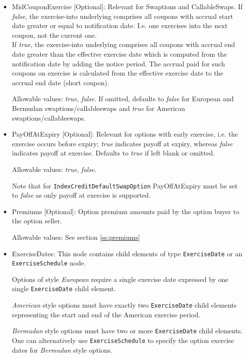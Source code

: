 \begin{itemize}
\item MidCouponExercise [Optional]: Relevant for Swaptions and CallableSwaps.
If \emph{false}, the exercise-into underlying comprises all coupons with accrual start date greater or equal to notification date. I.e. one exercises into the next coupon, not the current one.\\
If \emph{true}, the exercise-into underlying
comprises all coupons with accrual end date greater than the effective exercise date which is computed from the notification date by adding the notice period.
The accrual paid for such coupons on exercise is calculated from the effective exercise date to the accrual end date (short coupon).

Allowable values: \emph{true}, \emph{false}. If omitted, defaults to \emph{false} for European and Bermudan swaptions/callableswaps and \emph{true} for American swaptions/callableswaps.

\item PayOffAtExpiry [Optional]: Relevant for options with early
  exercise, i.e. the exercise occurs before expiry; \emph{true} indicates payoff at expiry, whereas \emph{false}
  indicates payoff at exercise. Defaults to \emph{true} if left blank or omitted.

Allowable values: \emph{true}, \emph{false}.

Note that for \lstinline!IndexCreditDefaultSwapOption! PayOffAtExpiry must be set to \emph{false} as only payoff at exercise is supported.



\item Premiums [Optional]: Option premium amounts paid by the option buyer to the option seller.

Allowable values:  See section \ref{ss:premiums}

\item ExerciseDates: This node contains child elements of type
  \lstinline!ExerciseDate! or an \lstinline!ExerciseSchedule! node.

  Options of style \emph{European}
  require a single exercise date expressed by one
  single \lstinline!ExerciseDate! child element.

  \emph{American} style
  options must have exactly two  \lstinline!ExerciseDate! child
  elements representing the start and end of the American exercise period.

  \emph{Bermudan} style options must have two or more \lstinline!ExerciseDate! child
  elements. One can alternatively use \lstinline!ExerciseSchedule! to
  specify the option exercise dates for \emph{Bermudan} style options.


\end{itemize}

